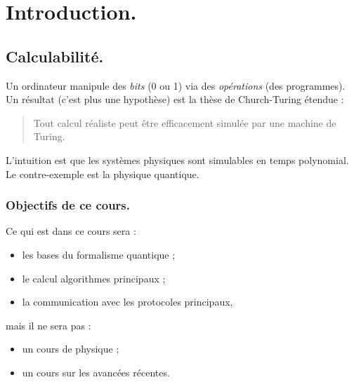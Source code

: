 \documentclass[./main]{subfiles}
\begin{document}
  \chapter{Introduction.}

  \section{Calculabilité.}

  Un ordinateur manipule des \textit{bits} (0 ou 1) via des \textit{opérations} (des programmes).
  Un résultat (c'est plus une hypothèse) est la thèse de Church-Turing étendue :
  \begin{quote}
    Tout calcul réaliste peut être efficacement simulée par une machine de Turing.
  \end{quote}
  L'intuition est que les systèmes physiques sont simulables en temps polynomial.
  Le contre-exemple est la physique quantique.


  \subsection{Objectifs de ce cours.}
  Ce qui est dans ce cours sera :
  \begin{itemize}
    \item les bases du formalisme quantique ;
    \item le calcul algorithmes principaux ;
    \item la communication avec les protocoles principaux,
  \end{itemize}
  mais il ne sera pas :
  \begin{itemize}
    \item un cours de physique ;
    \item un cours sur les avancées récentes.
  \end{itemize}
\end{document}
